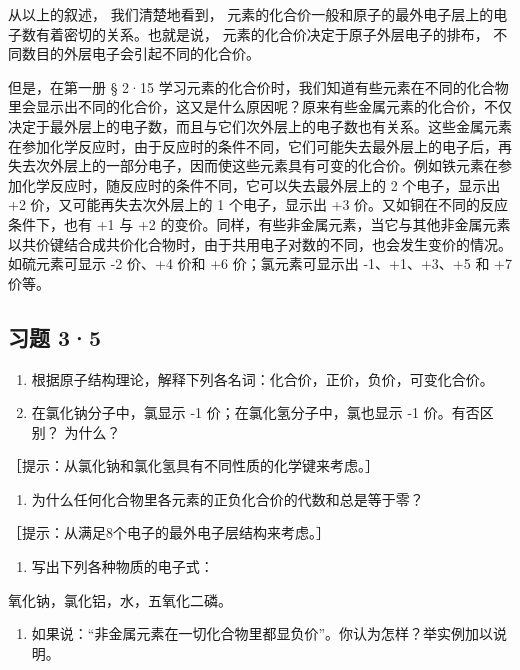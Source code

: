 从以上的叙述， 我们清楚地看到，
元素的化合价一般和原子的最外电子层上的电子数有着密切的关系。也就是说，
元素的化合价决定于原子外层电子的排布，
不同数目的外层电子会引起不同的化合价。

但是，在第一册 § 2·15
学习元素的化合价时，我们知道有些元素在不同的化合物里会显示出不同的化合价，这又是什么原因呢？原来有些金属元素的化合价，不仅决定于最外层上的电子数，而且与它们次外层上的电子数也有关系。这些金属元素在参加化学反应时，由于反应时的条件不同，它们可能失去最外层上的电子后，再失去次外层上的一部分电子，因而使这些元素具有可变的化合价。例如铁元素在参加化学反应时，随反应时的条件不同，它可以失去最外层上的
2 个电子，显示出 +2 价，又可能再失去次外层上的 1 个电子，显示出 +3
价。又如铜在不同的反应条件下，也有 +1 与 +2
的变价。同样，有些非金属元素，当它与其他非金属元素以共价键结合成共价化合物时，由于共用电子对数的不同，也会发生变价的情况。如硫元素可显示
-2 价、+4 价和 +6 价；氯元素可显示出 -1、+1、+3、+5 和 +7 价等。

\subsection{习题 3·5}

\begin{enumerate}
\item
  根据原子结构理论，解释下列各名词：化合价，正价，负价，可变化合价。
\item
  在氯化钠分子中，氯显示 -1 价；在氯化氢分子中，氯也显示 -1
  价。有否区别？ 为什么？
\end{enumerate}

［提示：从氯化钠和氯化氢具有不同性质的化学键来考虑。］

\begin{enumerate}[start=3]
\item
  为什么任何化合物里各元素的正负化合价的代数和总是等于零？
\end{enumerate}

［提示：从满足8个电子的最外电子层结构来考虑。］

\begin{enumerate}[start=4]
\item
  写出下列各种物质的电子式：
\end{enumerate}

氧化钠，氯化铝，水，五氧化二磷。

\begin{enumerate}[start=5]
\item
  如果说：``非金属元素在一切化合物里都显负价''。你认为怎样？举实例加以说明。
\end{enumerate}

